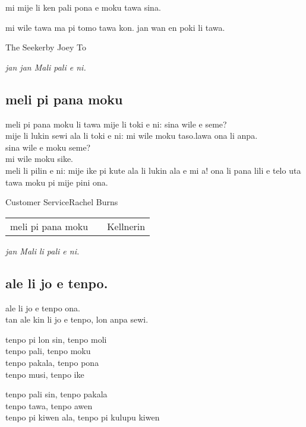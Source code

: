 mi mije li ken pali pona e moku tawa sina.

mi wile tawa ma pi tomo tawa kon. 
jan wan en poki li tawa.

\glqq The Seeker\grqq    by Joey To

\textit{jan jan Mali   pali e ni. \cite{www:astrodonunt:01}}

\subsection{meli pi pana moku }

meli pi pana moku li tawa mije li toki e ni: \glqq sina wile e seme?\grqq    \\
mije li lukin sewi ala li toki e ni: \glqq mi wile moku taso.\grqq   lawa ona li anpa. \\
\glqq  sina wile e moku seme?\grqq    \\
\glqq mi wile moku sike.\grqq    \\
meli li pilin e ni: \glqq  mije ike pi kute ala li lukin ala e mi a!\grqq   
ona li pana lili e telo uta tawa moku pi mije pini ona.

\glqq Customer Service\grqq Rachel Burns

\begin{supertabular}{p{5,5cm}|ll}
meli pi pana moku && Kellnerin  \\
\end{supertabular}

\textit{jan Mali li pali e ni. \cite{www:astrodonunt:01}}

\subsection{ale li jo e tenpo.}

ale li jo e tenpo ona. \\
tan ale kin li jo e tenpo, lon anpa sewi.

tenpo pi lon sin, tenpo moli \\
tenpo pali, tenpo moku \\
tenpo pakala, tenpo pona \\
tenpo musi, tenpo ike

tenpo pali sin, tenpo pakala \\
tenpo tawa, tenpo awen \\
tenpo pi kiwen ala, tenpo pi kulupu kiwen \\

